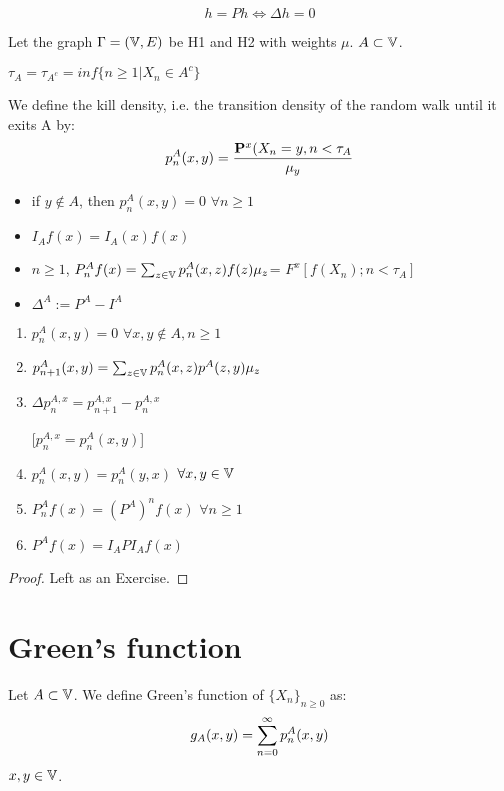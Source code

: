 \documentclass[main]{subfiles}
\begin{document}
$$h=Ph \Leftrightarrow \Delta h=0$$

Let the graph $\Gamma=(\V,E)$ be H1 and H2 with weights $\mu$. $A \subset \V$.

$\tau_A=\tau_{A^c}=inf\{n \geq 1 | X_n \in A^c\}$

We define the kill density, i.e. the transition density of the random walk until it exits A by: $$p_n^A(x,y)=\frac{\P^x(X_n=y, n<\tau_A}{\mu_y}$$

\begin{itemize}
    \item
          if $y \notin A$, then $p_n^A(x,y)=0$ $\forall n \geq 1$
    \item
          $I_Af(x)=I_A(x)f(x)$
    \item
          $n\geq 1$, $P_n^Af(x)=\sum_{z \in \V} p_n^A(x,z)f(z)\mu_z$= $F^x[f(X_n); n<\tau_A]$
    \item
          $\Delta^A:= P^A-I^A$
\end{itemize}
\begin{lemma}
    \begin{enumerate}[label=(\alph*)]
        \item $p_n^A(x,y)=0$  $\forall x,y \notin A, n \geq 1$ \\
              \item$ p_{n+1}^A(x,y)=\sum_{z \in \V} p_n^A(x,z)p^A(z,y)\mu_z$ \\
        \item $\Delta p_n^{A,x}=p_{n+1}^{A,x}-p_n^{A,x}$

              [$p_n^{A,x}=p_n^A(x,y)$]\\
        \item $ p_n^A(x,y) = p_n^A(y,x)$ $\forall x,y \in \V$ \\
        \item $P_n^Af(x)=(P^A)^nf(x)$ $\forall n \geq 1$ \\
        \item $P^Af(x)=I_API_Af(x)$
    \end{enumerate}
\end{lemma}
\begin{proof}
    Left as an Exercise.
\end{proof}
\section{Green's function}

Let $A\subset \V$. We define Green's function of $\{X_n\}_{n\geq0}$ as:
$$g_A(x,y)= \suminf p_n^A(x,y)$$
$x,y \in \V$.
\end{document}

